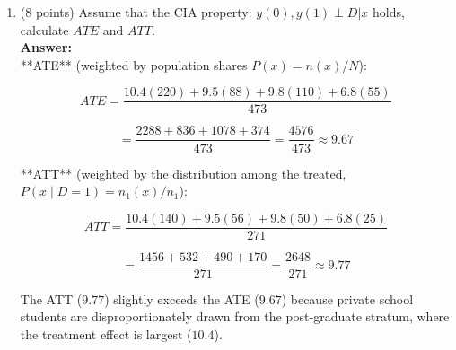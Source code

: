 \documentclass[letterpaper,12pt]{article}
\begin{document}
\begin{enumerate}[label=(\alph*)]
**2. Heterogeneous Treatment Effect Bias.** Even absent selection bias, the difference-in-means recovers the ATT (treatment effect weighted by the treated distribution), not the ATE (population-weighted average). If treatment effects differ across parental education groups  and if the distribution of $x$ in the treated group differs from the population distribution, then $\hat{\beta}_1 \neq ATE$. Private schools enroll relatively more high-education-background students, who also exhibit larger gains, further inflating the estimate.


\item (8 points) Assume that the CIA property: $y(0),y(1) \perp D|x$ holds, calculate $ATE$ and $ATT$. \\
\textbf{Answer:}\\

**ATE** (weighted by population shares $P(x) = n(x)/N$):

$$ATE =  \frac{10.4(220) + 9.5(88) + 9.8(110) + 6.8(55)}{473}$$

$$= \frac{2288 + 836 + 1078 + 374}{473} = \frac{4576}{473} \approx \boxed{9.67}$$

**ATT** (weighted by the distribution among the treated, $P(x\mid D=1) = n_1(x)/n_1$):

$$ATT = \frac{10.4(140) + 9.5(56) + 9.8(50) + 6.8(25)}{271}$$

$$= \frac{1456 + 532 + 490 + 170}{271} = \frac{2648}{271} \approx \boxed{9.77}$$

The ATT ($9.77$) slightly exceeds the ATE ($9.67$) because private school students are disproportionately drawn from the post-graduate stratum, where the treatment effect is largest ($10.4$).


\end{enumerate}
\end{document}

